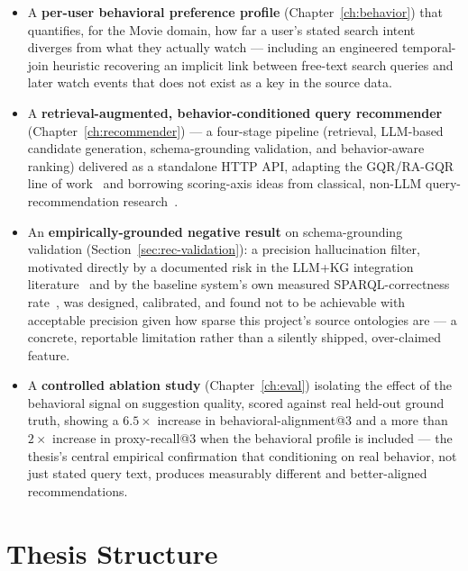 \begin{itemize}
    \item A \textbf{per-user behavioral preference profile} (Chapter~\ref{ch:behavior}) that
        quantifies, for the Movie domain, how far a user's stated search intent diverges from what
        they actually watch --- including an engineered temporal-join heuristic recovering an
        implicit link between free-text search queries and later watch events that does not exist
        as a key in the source data.
    \item A \textbf{retrieval-augmented, behavior-conditioned query recommender}
        (Chapter~\ref{ch:recommender}) --- a four-stage pipeline (retrieval, LLM-based candidate
        generation, schema-grounding validation, and behavior-aware ranking) delivered as a
        standalone HTTP API, adapting the GQR/RA-GQR line of work~\cite{bacciu2024} and borrowing
        scoring-axis ideas from classical, non-LLM query-recommendation research~\cite{barman2024}.
    \item An \textbf{empirically-grounded negative result} on schema-grounding validation
        (Section~\ref{sec:rec-validation}): a precision hallucination filter, motivated directly by
        a documented risk in the LLM+KG integration literature~\cite{pan2024} and by the baseline
        system's own measured SPARQL-correctness rate~\cite{balasooriya2026}, was designed,
        calibrated, and found not to be achievable with acceptable precision given how sparse this
        project's source ontologies are --- a concrete, reportable limitation rather than a silently
        shipped, over-claimed feature.
    \item A \textbf{controlled ablation study} (Chapter~\ref{ch:eval}) isolating the effect of the
        behavioral signal on suggestion quality, scored against real held-out ground truth, showing
        a $6.5\times$ increase in behavioral-alignment@3 and a more than $2\times$ increase in
        proxy-recall@3 when the behavioral profile is included --- the thesis's central empirical
        confirmation that conditioning on real behavior, not just stated query text, produces
        measurably different and better-aligned recommendations.
\end{itemize}

\section{Thesis Structure}
\label{sec:intro-outline}

